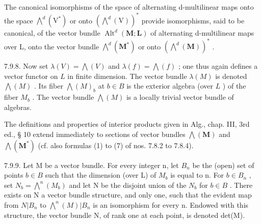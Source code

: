 The canonical isomorphisms of the space of alternating d-multilinear maps onto the space \(\bigwedge^{d}(\mathrm{V}^{*})\) or onto \((\bigwedge^{d}(\mathrm{V}))^{*}\) provide isomorphisms, said to be canonical, of the vector bundle \(\operatorname{Alt}^{d}(\mathbf{M};\mathbf{L})\) of alternating d-multilinear maps over L, onto the vector bundle \(\bigwedge^{d}(\mathbf{M}^{*})\) or onto \((\bigwedge^{d}(\mathbf{M}))^{*}\) .

7.9.8. Now set \(\lambda(V) = \bigwedge(V)\) and \(\lambda(f) = \bigwedge(f)\) ; one thus again defines a vector functor on \(L\) in finite dimension. The vector bundle \(\lambda(M)\) is denoted \(\bigwedge(M)\) . Its fiber \(\bigwedge(M)_b\) at \(b \in B\) is the exterior algebra (over \(L\) ) of the fiber \(M_b\) . The vector bundle \(\bigwedge(M)\) is a locally trivial vector bundle of algebras.

The definitions and properties of interior products given in Alg., chap. III, 3rd ed., § 10 extend immediately to sections of vector bundles \(\bigwedge(\mathbf{M})\) and \(\bigwedge(\mathbf{M}^{*})\) (cf. also formulas (1) to (7) of nos. 7.8.2 to 7.8.4).

7.9.9. Let M be a vector bundle. For every integer n, let \(B_{n}\) be the (open) set of points \(b \in B\) such that the dimension (over L) of \(M_{b}\) is equal to n. For \(b \in B_{n}\) , set \(N_{b} = \bigwedge^{n}(M_{b})\) and let N be the disjoint union of the \(N_{b}\) for \(b \in B\) . There exists on N a vector bundle structure, and only one, such that the evident map from \(N|B_{n}\) to \(\bigwedge^{n}(M)|B_{n}\) is an isomorphism for every n. Endowed with this structure, the vector bundle N, of rank one at each point, is denoted det(M).

